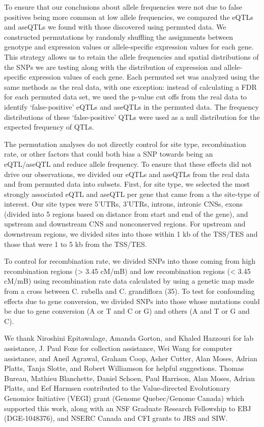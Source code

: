 To ensure that our conclusions about allele frequencies were not due to false positives being more common at low allele frequencies, we compared the eQTLs and aseQTLs we found with those discovered using permuted data. We constructed permutations by randomly shuffling the assignments between genotype and expression values or allele-specific expression values for each gene. This strategy allows us to retain the allele frequencies and spatial distributions of the SNPs we are testing along with the distribution of expression and allele-specific expression values of each gene. Each permuted set was analyzed using the same methods as the real data, with one exception: instead of calculating a FDR for each permuted data set, we used the p-value cut offs from the real data to identify ‘false-positive’ eQTLs and aseQTLs in the permuted data. The frequency distributions of these ‘false-positive’ QTLs were used as a null distribution for the expected frequency of QTLs.

The permutation analyses do not directly control for site type, recombination rate, or other factors that could both bias a SNP towards being an eQTL/aseQTL and reduce allele frequency. To ensure that these effects did not drive our observations, we divided our eQTLs and aseQTLs from the real data and from permuted data into subsets. First, for site type, we selected the most strongly associated eQTL and aseQTL per gene that came from a the site-type of interest. Our site types were 5’UTRs, 3’UTRs, introns, intronic CNSs, exons (divided into 5 regions based on distance from start and end of the gene), and upstream and downstream CNS and nonconserved regions. For upstream and downstream regions, we divided sites into those within 1 kb of the TSS/TES and those that were 1 to 5 kb from the TSS/TES. 

 To control for recombination rate, we divided SNPs into those coming from high recombination regions (> 3.45 cM/mB) and low recombination regions (< 3.45 cM/mB) using recombination rate data calculated by using a genetic map made from a cross between C. rubella and C. grandiflora (35). To test for confounding effects due to gene conversion, we divided SNPs into those whose mutations could be due to gene conversion (A or T and C or G) and others (A and T or G and C).

We thank Niroshini Epitawalage, Amanda Gorton, and Khaled Hazzouri for lab assistance, J. Paul Foxe for collection assistance, Wei Wang for computer assistance, and Aneil Agrawal, Graham Coop, Asher Cutter, Alan Moses, Adrian Platts, Tanja Slotte, and Robert Williamson for helpful suggestions. Thomas Bureau, Mathieu Blanchette, Daniel Schoen, Paul Harrison, Alan Moses, Adrian Platts, and Eef Harmsen contributed to the Value-directed Evolutionary Genomics Initiative (VEGI) grant (Genome Quebec/Genome Canada) which supported this work, along with an NSF Graduate Research Fellowship to EBJ (DGE-1048376), and NSERC Canada and CFI grants to JRS and SIW. 

